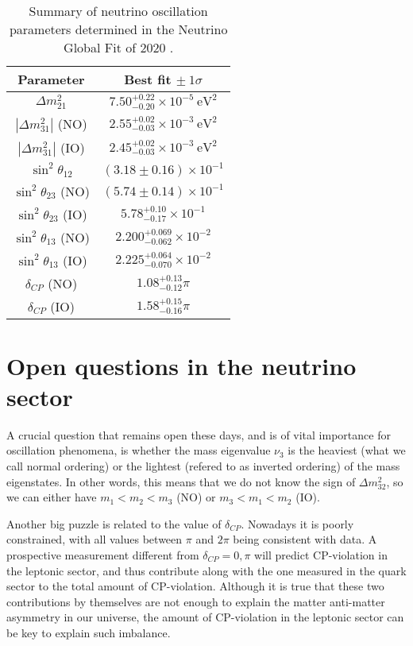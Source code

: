 \begin{table}
\centering
\caption{Summary of neutrino oscillation parameters determined in the Neutrino Global Fit of 2020 \cite{deSalas2020}.}
\begin{tabular}{|c|c|}
	\hline
	Parameter & Best fit $\pm \ 1\sigma$ \\
	\hline
	$\Delta m^{2}_{21}$ & $7.50^{+0.22}_{-0.20} \times 10^{-5} \ \mathrm{eV}^{2}$ \\
	\hline
	$\left|\Delta m^{2}_{31}\right|$ (NO) & $2.55^{+0.02}_{-0.03} \times 10^{-3} \ \mathrm{eV}^{2}$ \\
	\hline
	$\left|\Delta m^{2}_{31}\right|$ (IO) & $2.45^{+0.02}_{-0.03} \times 10^{-3} \ \mathrm{eV}^{2}$ \\
	\hline
	$\sin^{2} \theta_{12}$ & $(3.18 \pm 0.16) \times 10^{-1}$ \\
	\hline
	$\sin^{2} \theta_{23}$ (NO) & $(5.74 \pm 0.14) \times 10^{-1}$ \\
	\hline
	$\sin^{2} \theta_{23}$ (IO) & $5.78^{+0.10}_{-0.17}  \times 10^{-1}$ \\
	\hline
	$\sin^{2} \theta_{13}$ (NO) & $2.200^{+0.069}_{-0.062}  \times 10^{-2}$ \\
	\hline
	$\sin^{2} \theta_{13}$ (IO) & $2.225^{+0.064}_{-0.070}  \times 10^{-2}$ \\
	\hline
	$\delta_{CP}$ (NO) & $1.08^{+0.13}_{-0.12} \pi$ \\
	\hline
	$\delta_{CP}$ (IO) & $1.58^{+0.15}_{-0.16} \pi$ \\
	\hline
\end{tabular}
\end{table}

\section{Open questions in the neutrino sector}

A crucial question that remains open these days, and is of vital importance for oscillation phenomena, is whether the mass eigenvalue $\nu_{3}$ is the heaviest (what we call normal ordering) or the lightest (refered to as inverted ordering) of the mass eigenstates. In other words, this means that we do not know the sign of $\Delta m^{2}_{32}$, so we can either have $m_{1}<m_{2}<m_{3}$ (NO) or $m_{3}<m_{1}<m_{2}$ (IO).

Another big puzzle is related to the value of $\delta_{CP}$. Nowadays it is poorly constrained, with all values between $\pi$ and $2\pi$ being consistent with data. A prospective measurement different from $\delta_{CP}=0,\pi$ will predict CP-violation in the leptonic sector, and thus contribute along with the one measured in the quark sector to the total amount of CP-violation. Although it is true that these two contributions by themselves are not enough to explain the matter anti-matter asymmetry in our universe, the amount of CP-violation in the leptonic sector can be key to explain such imbalance.

